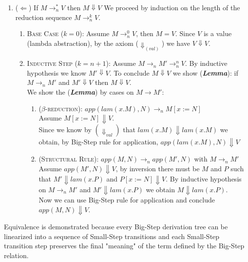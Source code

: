 \begin{solution}
\begin{enumerate}
\item {($\Leftarrow$)} If $M \to_n^* V$ then  $M \Downarrow V$ 
We proceed by induction on the length of the reduction sequence $M \to_n^k V$.
\begin{enumerate}
    \item \textsc{Base Case ($k=0$)}: Assume $M \to^0_n V$, then $M=V$. Since $V$ is a value (lambda abstraction), by the axiom  ($\Downarrow_{(val)}$) we have $V\Downarrow V$. 

     \item \textsc{Inductive Step ($k=n+1$)}: Assume $M \to_n M'\to_n^n V$. By inductive hypothesis we know $M'\Downarrow V$. To conclude $M\Downarrow V$ we show (\textbf{\textit{Lemma}}): if $M \to_n M' $ and $M'\Downarrow V$ then $M\Downarrow V$. \\ We show the (\textbf{\textit{Lemma}}) by cases on $M \to M'$:
    \begin{enumerate}
        \item \textsc{($\beta$-reduction)}: $app(lam(x.M),N) \to_n M[x:=N]$
        \\
        Assume $ M[x:=N] \Downarrow V$. 
        \\Since we know by $(\Downarrow_{val})$ that  $lam(x.M) \Downarrow lam(x.M)$ we obtain, by Big-Step rule for application, $app(lam(x.M),N) \Downarrow V$
         \item \textsc{(Structural Rule)}: $app(M,N) \to_n app(M', N)$ with $M\to_n M'$
         \\
         Assume $app(M',N) \Downarrow V$, by inversion there must be $M$ and $P$ such that $M' \Downarrow lam(x.P)$ and $P[x:=N]\Downarrow V$. By inductive hypothesis on $M\to_n M'$ and $M'\Downarrow lam(x.P)$ we obtain $M\Downarrow lam(x.P)$. 
        \\
        Now we can use Big-Step rule for application and conclude $app(M,N)\Downarrow V$.
    \end{enumerate}
\end{enumerate}

\end{enumerate}
Equivalence is demonstrated because every Big-Step derivation tree can be linearized into a sequence of Small-Step transitions and each Small-Step transition step preserves the final "meaning" of the term defined by the Big-Step relation.

\end{solution}